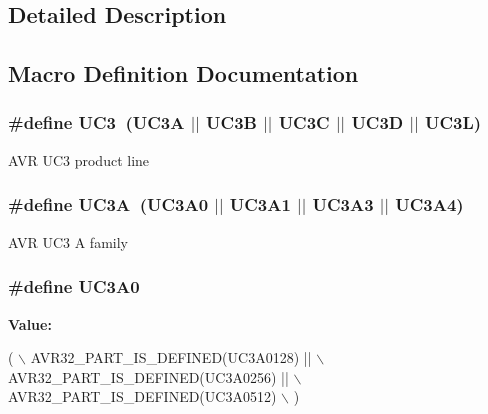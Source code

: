 \subsection{Detailed Description}


\subsection{Macro Definition Documentation}
\hypertarget{group__uc3__part__macros__group_ga848d950beec67bc702bfcfdecc70bb5b}{
\subsubsection[{U\-C3}]{\setlength{\rightskip}{0pt plus 5cm}\#define U\-C3~({\bf U\-C3\-A} $|$$|$ {\bf U\-C3\-B} $|$$|$ {\bf U\-C3\-C} $|$$|$ {\bf U\-C3\-D} $|$$|$ {\bf U\-C3\-L})}}\label{group__uc3__part__macros__group_ga848d950beec67bc702bfcfdecc70bb5b}
A\-V\-R U\-C3 product line \hypertarget{group__uc3__part__macros__group_gaf7f16cc2bde7daf34576983fee8824c8}{
\subsubsection[{U\-C3\-A}]{\setlength{\rightskip}{0pt plus 5cm}\#define U\-C3\-A~(U\-C3\-A0 $|$$|$ U\-C3\-A1 $|$$|$ U\-C3\-A3 $|$$|$ U\-C3\-A4)}}\label{group__uc3__part__macros__group_gaf7f16cc2bde7daf34576983fee8824c8}
A\-V\-R U\-C3 A family \hypertarget{group__uc3__part__macros__group_gaee4dd9ce50cc26707d159660db9fc408}{
\subsubsection[{U\-C3\-A0}]{\setlength{\rightskip}{0pt plus 5cm}\#define U\-C3\-A0}}\label{group__uc3__part__macros__group_gaee4dd9ce50cc26707d159660db9fc408}
{\bfseries Value\-:}
\begin{DoxyCode}
(       \(\backslash\)
                AVR32\_PART\_IS\_DEFINED(UC3A0128) || \(\backslash\)
                AVR32\_PART\_IS\_DEFINED(UC3A0256) || \(\backslash\)
                AVR32\_PART\_IS\_DEFINED(UC3A0512) \(\backslash\)
                )
\end{DoxyCode}
